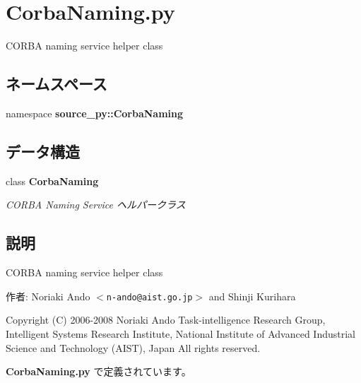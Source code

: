 \section{CorbaNaming.py}
\label{_corba_naming_8py}
CORBA naming service helper class 

\subsection*{ネームスペース}
\begin{CompactItemize}
\item 
namespace \textbf{source\_\-py::CorbaNaming}
\end{CompactItemize}
\subsection*{データ構造}
\begin{CompactItemize}
\item 
class {\bf CorbaNaming}
\begin{CompactList}\small\item\em CORBA Naming Service ヘルパークラス \item\end{CompactList}\end{CompactItemize}


\subsection{説明}
CORBA naming service helper class 

\begin{Desc}
\item[作者:]Noriaki Ando $<${\tt n-ando@aist.go.jp}$>$ and Shinji Kurihara\end{Desc}
Copyright (C) 2006-2008 Noriaki Ando Task-intelligence Research Group, Intelligent Systems Research Institute, National Institute of Advanced Industrial Science and Technology (AIST), Japan All rights reserved. 

 {\bf CorbaNaming.py} で定義されています。